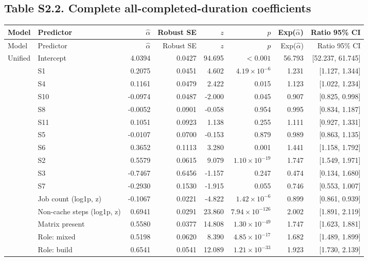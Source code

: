 \documentclass{article}
\begin{document}
\subsection*{Table S2.2. Complete all-completed-duration coefficients}
\footnotesize\begin{longtable}{>{\raggedright\arraybackslash}p{2.4cm}>{\raggedright\arraybackslash}p{3.8cm}rrrrrr}
\toprule Model & Predictor & $\hat\alpha$ & Robust SE & $z$ & $p$ & Exp($\hat\alpha$) & Ratio 95\% CI\\\midrule\endfirsthead
\toprule Model & Predictor & $\hat\alpha$ & Robust SE & $z$ & $p$ & Exp($\hat\alpha$) & Ratio 95\% CI\\\midrule\endhead
Unified & Intercept & 4.0394 & 0.0427 & 94.695 & $<0.001$ & 56.793 & [52.237, 61.745] \\
 & S1 & 0.2075 & 0.0451 & 4.602 & $4.19\times10^{-6}$ & 1.231 & [1.127, 1.344] \\
 & S4 & 0.1161 & 0.0479 & 2.422 & 0.015 & 1.123 & [1.022, 1.234] \\
 & S10 & -0.0974 & 0.0487 & -2.000 & 0.045 & 0.907 & [0.825, 0.998] \\
 & S8 & -0.0052 & 0.0901 & -0.058 & 0.954 & 0.995 & [0.834, 1.187] \\
 & S11 & 0.1051 & 0.0923 & 1.138 & 0.255 & 1.111 & [0.927, 1.331] \\
 & S5 & -0.0107 & 0.0700 & -0.153 & 0.879 & 0.989 & [0.863, 1.135] \\
 & S6 & 0.3652 & 0.1113 & 3.280 & 0.001 & 1.441 & [1.158, 1.792] \\
 & S2 & 0.5579 & 0.0615 & 9.079 & $1.10\times10^{-19}$ & 1.747 & [1.549, 1.971] \\
 & S3 & -0.7467 & 0.6456 & -1.157 & 0.247 & 0.474 & [0.134, 1.680] \\
 & S7 & -0.2930 & 0.1530 & -1.915 & 0.055 & 0.746 & [0.553, 1.007] \\
 & Job count (log1p, z) & -0.1067 & 0.0221 & -4.822 & $1.42\times10^{-6}$ & 0.899 & [0.861, 0.939] \\
 & Non-cache steps (log1p, z) & 0.6941 & 0.0291 & 23.860 & $7.94\times10^{-126}$ & 2.002 & [1.891, 2.119] \\
 & Matrix present & 0.5580 & 0.0377 & 14.808 & $1.30\times10^{-49}$ & 1.747 & [1.623, 1.881] \\
 & Role: mixed & 0.5198 & 0.0620 & 8.390 & $4.85\times10^{-17}$ & 1.682 & [1.489, 1.899] \\
 & Role: build & 0.6541 & 0.0541 & 12.089 & $1.21\times10^{-33}$ & 1.923 & [1.730, 2.139] \\

\end{longtable}
\end{document}
